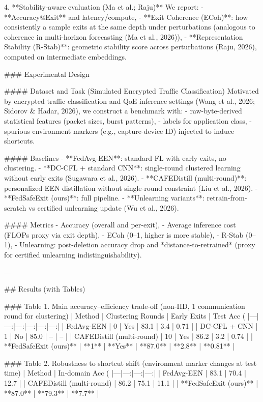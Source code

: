 4. **Stability-aware evaluation (Ma et al.; Raju)**  
We report:
- **Accuracy@Exit** and latency/compute,
- **Exit Coherence (ECoh)**: how consistently a sample exits at the same depth under perturbations (analogous to coherence in multi-horizon forecasting (Ma et al., 2026)),
- **Representation Stability (R-Stab)**: geometric stability score across perturbations (Raju, 2026), computed on intermediate embeddings.

### Experimental Design  

#### Dataset and Task (Simulated Encrypted Traffic Classification)  
Motivated by encrypted traffic classification and QoE inference settings (Wang et al., 2026; Sidorov & Hadar, 2026), we construct a benchmark with:
- raw-byte-derived statistical features (packet sizes, burst patterns),
- labels for application class,
- spurious environment markers (e.g., capture-device ID) injected to induce shortcuts.

#### Baselines  
- **FedAvg-EEN**: standard FL with early exits, no clustering.  
- **DC-CFL + standard CNN**: single-round clustered learning without early exits (Sugawara et al., 2026).  
- **CAFEDistill (multi-round)**: personalized EEN distillation without single-round constraint (Liu et al., 2026).  
- **FedSafeExit (ours)**: full pipeline.  
- **Unlearning variants**: retrain-from-scratch vs certified unlearning update (Wu et al., 2026).

#### Metrics  
- Accuracy (overall and per-exit),  
- Average inference cost (FLOPs proxy via exit depth),  
- ECoh (0–1, higher is more stable),  
- R-Stab (0–1),  
- Unlearning: post-deletion accuracy drop and *distance-to-retrained* (proxy for certified unlearning indistinguishability).

---

## Results (with Tables)  

### Table 1. Main accuracy–efficiency trade-off (non-IID, 1 communication round for clustering)
| Method | Clustering Rounds | Early Exits | Test Acc (%
|---|---:|---:|---:|---:|---:|
| FedAvg-EEN | 0 | Yes | 83.1 | 3.4 | 0.71 |
| DC-CFL + CNN | 1 | No | 85.0 | – | – |
| CAFEDistill (multi-round) | 10 | Yes | 86.2 | 3.2 | 0.74 |
| **FedSafeExit (ours)** | **1** | **Yes** | **87.0** | **2.8** | **0.81** |

### Table 2. Robustness to shortcut shift (environment marker changes at test time)
| Method | In-domain Acc (%
|---|---:|---:|---:|
| FedAvg-EEN | 83.1 | 70.4 | 12.7 |
| CAFEDistill (multi-round) | 86.2 | 75.1 | 11.1 |
| **FedSafeExit (ours)** | **87.0** | **79.3** | **7.7** |

